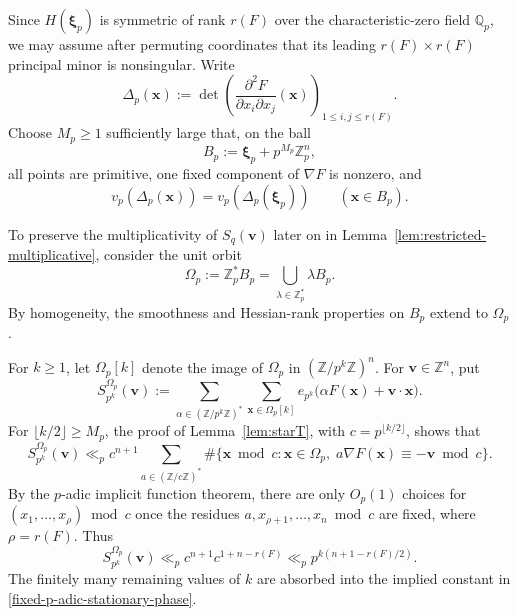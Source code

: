\documentclass[a4paper,11pt, twoside,reqno]{amsart}
\theoremstyle{plain}
\theoremstyle{definition}
\theoremstyle{remark}
\newcommand{\Z}{\mathbb{Z}}
\newcommand{\bfv}{\bm{v}}
\newcommand{\bfx}{\bm{x}}
\newcommand{\ZZ}{\mathbb{Z}}
\newcommand{\QQ}{\mathbb{Q}}
\renewcommand{\leq}{\leqslant}
\renewcommand{\geq}{\geqslant}
\numberwithin{equation}{section}
\begin{document}
Since $H(\boldsymbol{\xi}_p)$ is symmetric of rank $r(F)$ over the
characteristic-zero field $\QQ_p$,
we may assume after permuting coordinates that
its leading $r(F)\times r(F)$ principal
minor is nonsingular.  Write
\[
\Delta_p(\bfx)
:=\det\left(\frac{\partial^2F}
{\partial x_i\partial x_j}(\bfx)\right)_{1\leq i,j\leq r(F)}.
\]
Choose $M_p\geq1$ sufficiently large that, on the ball
\begin{equation}\label{eq:inel-ball}
B_p:=\boldsymbol{\xi}_p+p^{M_p}\Z_p^n,
\end{equation}
all points are primitive, one fixed component of $\nabla F$ is nonzero, and
\begin{equation}\label{eq:inel-minor-valuation}
v_p(\Delta_p(\bfx))=v_p(\Delta_p(\boldsymbol{\xi}_p))
\qquad(\bfx\in B_p).
\end{equation}

To preserve the multiplicativity of $S_q(\bfv)$ later on
in Lemma~\ref{lem:restricted-multiplicative},
consider the unit orbit
\begin{equation}\label{eq:inel-Omega}
\Omega_p := \Z_p^\ast B_p
=\bigcup_{\lambda\in\Z_p^\ast}\lambda B_p.
\end{equation}
By homogeneity, the smoothness and Hessian-rank properties on $B_p$ extend to $\Omega_p$.

For $k\geq1$, let $\Omega_p[k]$ denote the image of $\Omega_p$ in
$(\Z/p^k\Z)^n$.
For $\bfv\in\Z^n$, put
\begin{equation}\label{eq:inel-localised-sum}
S_{p^k}^{\Omega_p}(\bfv)
:= \sum_{\alpha\in(\Z/p^k\Z)^\ast}
\sum_{\bfx\in\Omega_p[k]}
e_{p^k}\bigl(\alpha F(\bfx)+\bfv\cdot\bfx\bigr).
\end{equation}
For $\lfloor k/2\rfloor\geq M_p$, the proof of Lemma~\ref{lem:starT}, with $c = p^{\lfloor k/2 \rfloor}$, shows that
\begin{equation*}
S_{p^k}^{\Omega_p}(\bfv)
\ll_p c^{n+1} \sum_{a\in (\ZZ/c\ZZ)^\ast}
\#\{\bfx\bmod{c}: \bfx\in \Omega_p,\; a\nabla F(\bfx) \equiv -\bfv \bmod{c}\}.
\end{equation*}
By the $p$-adic implicit function theorem,
there are only $O_p(1)$ choices for $(x_1,\dots,x_\rho)\bmod{c}$
once the residues $a,x_{\rho+1},\dots,x_n\bmod{c}$ are fixed,
where $\rho=r(F)$.
Thus 
\begin{equation}
\label{fixed-p-adic-stationary-phase}
S_{p^k}^{\Omega_p}(\bfv)
\ll_p c^{n+1} c^{1+n-r(F)}
\ll_p p^{k(n+1-r(F)/2)}.
\end{equation}
The finitely many remaining values of $k$ are absorbed into the implied constant
in \eqref{fixed-p-adic-stationary-phase}.
\end{document}
